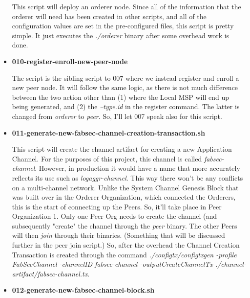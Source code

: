\begin{itemize}
					\hspace{10mm}This script will deploy an orderer node. Since all of the information that the orderer will need has been created in other scripts, and all of the configuration values are set in the pre-configured files, this script is pretty simple. It just executes the \textit{./orderer} binary after some overhead work is done.
					
				\item \textbf{010-register-enroll-new-peer-node}
				
					\hspace{10mm}The script is the sibling script to 007 where we instead register and enroll a new peer node. It will follow the same logic, as there is not much difference between the two action other than (1) where the Local MSP will end up being generated, and (2) the \textit{--type.id} in the register command. The latter is changed from \textit{orderer} to \textit{peer}. So, I'll let 007 speak also for this script.
					
				\item \textbf{011-generate-new-fabsec-channel-creation-transaction.sh}
				
					\hspace{10mm}This script will create the channel artifact for creating a new Application Channel. For the purposes of this project, this channel is called \textit{fabsec-channel}. However, in production it would have a name that more accurately reflects its use such as \textit{logaggr-channel}. This way there won't be any conflicts on a multi-channel network. Unlike the System Channel Genesis Block that was built over in the Orderer Organization, which connected the Orderers, this is the start of connecting up the Peers. So, it'll take place in Peer Organization 1. Only one Peer Org needs to create the channel (and subsequently "create" the channel through the \textit{peer} binary. The other Peers will then \textit{join} through their binaries. (Something that will be discussed further in the peer join script.) So, after the overhead the Channel Creation Transaction is created through the command \textit{./configtx/configtxgen -profile FabSecChannel -channelID fabsec-channel -outputCreateChannelTx ./channel-artifact/fabsec-channel.tx}.
					
				\item \textbf{012-generate-new-fabsec-channel-block.sh}
					

\end{itemize}
